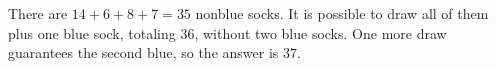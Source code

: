 There are $14+6+8+7=35$ nonblue socks. It is possible to draw all of them plus one blue sock, totaling $36$, without two blue socks. One more draw guarantees the second blue, so the answer is $\boxed{37}$.
